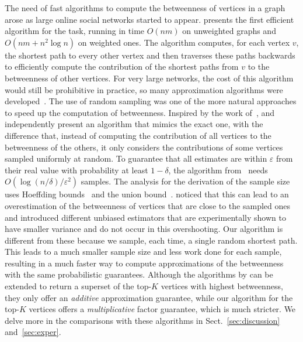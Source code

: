 The need of fast algorithms to compute the betweenness of vertices in a graph
arose as large online social networks started to appear. \citet{Brandes01} presents the
first efficient algorithm for the task, running in time $O(nm)$ on
unweighted graphs and $O(nm+n^2\log n)$ on weighted ones. The
algorithm computes, for each vertex $v$, the shortest path to every other vertex
and then traverses these paths backwards to efficiently compute the contribution
of the shortest paths from $v$ to the betweenness of other vertices. For very
large networks, the cost of this algorithm would still be prohibitive in
practice, so many approximation algorithms were
developed~\citep{JacobKLPT05,BrandesP07,BaderKMM07,GeisbergerSS08,MaiyaBW10,LimMRTB11}.
The use of random sampling was one of the more natural approaches to speed up
the computation of betweenness. Inspired by the work of~\citet{EppsteinW04},
\citet{JacobKLPT05} and independently \citet{BrandesP07} present an algorithm
that mimics the exact one, with the difference that,
instead of computing the contribution of all vertices to the betweenness of the
others, it only considers the contributions of some vertices sampled uniformly
at random. To guarantee that all estimates are within $\varepsilon$ from their
real value with probability at least $1-\delta$, the algorithm
from~\citep{JacobKLPT05,BrandesP07} needs $O(\log(n/\delta)/\varepsilon^2)$
samples. The analysis for the derivation of the sample size uses Hoeffding bounds~\citep{Hoeffding63} 
and the union bound~\citep{MitzenmacherU05}. 
\citet{GeisbergerSS08} noticed that this can lead
to an overestimation of the betweenness of vertices that are close to the
sampled ones and introduced different unbiased estimators that are
experimentally shown to have smaller variance and do not occur in this
overshooting. Our algorithm is different from these because we sample, each
time, a single random shortest path. %
This leads to a much smaller sample size and less work done for each sample,
resulting in a much faster way to compute approximations of the betweenness with
the same probabilistic guarantees. 
\ifproof
Although the algorithms by
\citep{BrandesP07,JacobKLPT05,GeisbergerSS08} can be extended to return a
superset of the top-$K$ vertices with highest betweenness, they only offer an
\emph{additive} approximation guarantee, while our algorithm for the top-$K$
vertices offers a \emph{multiplicative} factor guarantee, which is much
stricter. 
\fi
We delve more in the comparisons with these algorithms in
Sect.~\ref{sec:discussion} and~\ref{sec:exper}. 

